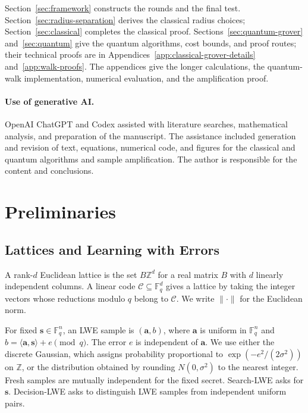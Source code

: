 \documentclass[runningheads,envcountsame,envcountsect,orivec]{llncs}
\begin{document}
Section~\ref{sec:framework} constructs the rounds and the final
test. Section~\ref{sec:radius-separation} derives the classical radius choices;
Section~\ref{sec:classical} completes the classical proof.
Sections~\ref{sec:quantum-grover} and~\ref{sec:quantum} give the quantum
algorithms, cost bounds, and proof routes; their technical proofs
are in Appendices~\ref{app:classical-grover-details} and~\ref{app:walk-proofs}. The appendices give the longer calculations,
the quantum-walk implementation, numerical evaluation, and
the amplification proof.

\paragraph{Use of generative AI.}
OpenAI ChatGPT and Codex assisted with literature searches, mathematical
analysis, and preparation of the manuscript. The assistance included
generation and revision of text, equations, numerical code, and figures
for the classical and quantum algorithms and sample amplification.
The author is responsible for the content and conclusions.

\FloatBarrier

\section{Preliminaries}
\label{sec:prelim}

\subsection{Lattices and Learning with Errors}

A rank-$d$ Euclidean lattice is the set $B\mathbb Z^d$ for a
real matrix $B$ with $d$ linearly independent columns. A linear
code $\mathcal C\subseteq\mathbb F_q^d$ gives a lattice by taking
the integer vectors whose reductions modulo $q$ belong to
$\mathcal C$. We write $\|\cdot\|$ for the Euclidean norm.

For fixed $\boldsymbol s\in\mathbb F_q^n$, an LWE sample is
$(\boldsymbol a,b)$, where $\boldsymbol a$ is uniform in
$\mathbb F_q^n$ and
\(b=\langle\boldsymbol a,\boldsymbol s\rangle+e\pmod q\).
The error $e$ is independent of $\boldsymbol a$. We use either the
discrete Gaussian, which assigns probability proportional to
$\exp(-e^2/(2\sigma^2))$ on $\mathbb Z$, or the distribution obtained by
rounding $N(0,\sigma^2)$ to the nearest integer. Fresh samples
are mutually independent for the fixed secret. Search-LWE
asks for $\boldsymbol s$. Decision-LWE asks to distinguish
LWE samples from independent uniform pairs.
\end{document}
